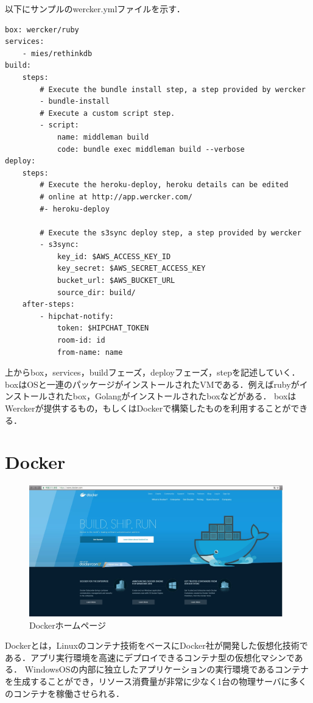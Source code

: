 \newpage

以下にサンプルのwercker.ymlファイルを示す．
\begin{lstlisting}[basicstyle=\ttfamily\footnotesize, frame=single]
box: wercker/ruby
services:
    - mies/rethinkdb
build:
    steps:
        # Execute the bundle install step, a step provided by wercker
        - bundle-install
        # Execute a custom script step.
        - script:
            name: middleman build
            code: bundle exec middleman build --verbose
deploy:
    steps:
        # Execute the heroku-deploy, heroku details can be edited
        # online at http://app.wercker.com/
        #- heroku-deploy

        # Execute the s3sync deploy step, a step provided by wercker
        - s3sync:
            key_id: $AWS_ACCESS_KEY_ID
            key_secret: $AWS_SECRET_ACCESS_KEY
            bucket_url: $AWS_BUCKET_URL
            source_dir: build/
    after-steps:
        - hipchat-notify:
            token: $HIPCHAT_TOKEN
            room-id: id
            from-name: name
\end{lstlisting}

上からbox，services，buildフェーズ，deployフェーズ，stepを記述していく．
boxはOSと一連のパッケージがインストールされたVMである．例えばrubyがインストールされたbox，Golangがインストールされたboxなどがある．
boxはWerckerが提供するもの，もしくはDockerで構築したものを利用することができる．

\newpage

\section{Docker}
\begin{figure}[htb]
\centering
\includegraphics[width=11cm]{33.JPG}
\caption{Dockerホームページ}\label{tab:uac}
\end{figure}
Dockerとは，Linuxのコンテナ技術をベースにDocker社が開発した仮想化技術である．アプリ実行環境を高速にデプロイできるコンテナ型の仮想化マシンである\cite{3}．
WindowsOSの内部に独立したアプリケーションの実行環境であるコンテナを生成することができ，リソース消費量が非常に少なく1台の物理サーバに多くのコンテナを稼働させられる．


